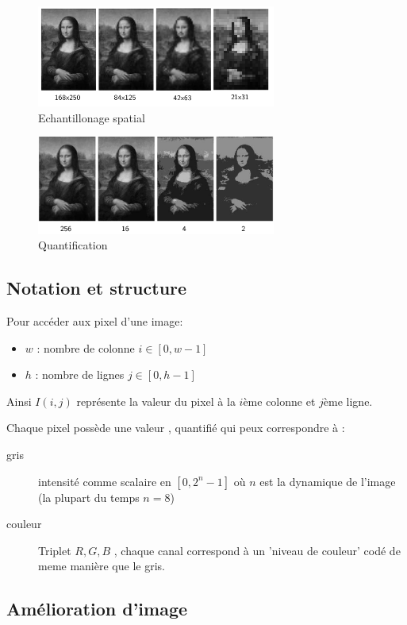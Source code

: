 \documentclass[main.tex]{subfiles}
\begin{document}
\begin{figure}[H]
  \centering
  \includegraphics[width=0.7\textwidth]{img/mona_lisa_echantillon.png}
  \caption{Echantillonage spatial}
\end{figure}
\newpage
\begin{figure}[H]
  \centering
  \includegraphics[width=0.7\textwidth]{img/mona_lisa_quantif.png}
  \caption{Quantification}
\end{figure}
\subsection{Notation et structure}

Pour accéder aux pixel d'une image:

\begin{itemize}
\item $w$ : nombre de colonne $i\in[0,w-1]$
\item $h$ : nombre de lignes $j\in [0,h-1]$
\end{itemize}
Ainsi $I(i,j)$ représente la valeur du pixel à la $i$ème colonne et $j$ème ligne.

Chaque pixel possède une valeur , quantifié qui peux correspondre à :
\begin{description}
\item[gris] intensité comme scalaire en $[0,2^n-1]$ où $n$ est la dynamique de l'image (la plupart du temps $n=8$)

\item[couleur] Triplet $R,G,B$ , chaque canal correspond à un 'niveau de couleur' codé de meme manière que le gris.
\end{description}

\subsection{Amélioration d'image}
\end{document}
